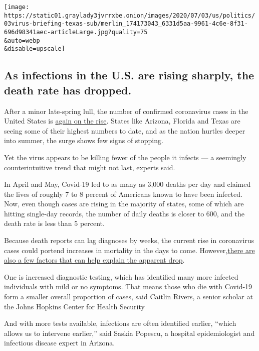 \texttt{[image: https://static01.graylady3jvrrxbe.onion/images/2020/07/03/us/politics/03virus-briefing-texas-sub/merlin\_174173043\_6331d5aa-9961-4c6e-8f31-696d98341aec-articleLarge.jpg?quality=75\\\&auto=webp\\\&disable=upscale]}

\hypertarget{as-infections-in-the-us-are-rising-sharply-the-death-rate-has-dropped}{%
\subsection{As infections in the U.S. are rising sharply, the death rate
has
dropped.}\label{as-infections-in-the-us-are-rising-sharply-the-death-rate-has-dropped}}

After a minor late-spring lull, the number of confirmed coronavirus
cases in the United States is
\href{https://www.nytimes3xbfgragh.onion/interactive/2020/us/coronavirus-us-cases.html}{again
on the rise}. States like Arizona, Florida and Texas are seeing some of
their highest numbers to date, and as the nation hurtles deeper into
summer, the surge shows few signs of stopping.

Yet the virus appears to be killing fewer of the people it infects --- a
seemingly counterintuitive trend that might not last, experts said.

In April and May, Covid-19 led to as many as 3,000 deaths per day and
claimed the lives of roughly 7 to 8 percent of Americans known to have
been infected. Now, even though cases are rising in the majority of
states, some of which are hitting single-day records, the number of
daily deaths is closer to 600, and the death rate is less than 5
percent.

Because death reports can lag diagnoses by weeks, the current rise in
coronavirus cases could portend increases in mortality in the days to
come.
However,\href{https://www.nytimes3xbfgragh.onion/2020/07/03/health/coronavirus-mortality-testing.html}{there
are also a few factors that can help explain the apparent drop}.

One is increased diagnostic testing, which has identified many more
infected individuals with mild or no symptoms. That means those who die
with Covid-19 form a smaller overall proportion of cases, said Caitlin
Rivers, a senior scholar at the Johns Hopkins Center for Health Security

And with more tests available, infections are often identified earlier,
``which allows us to intervene earlier,'' said Saskia Popescu, a
hospital epidemiologist and infectious disease expert in Arizona.

